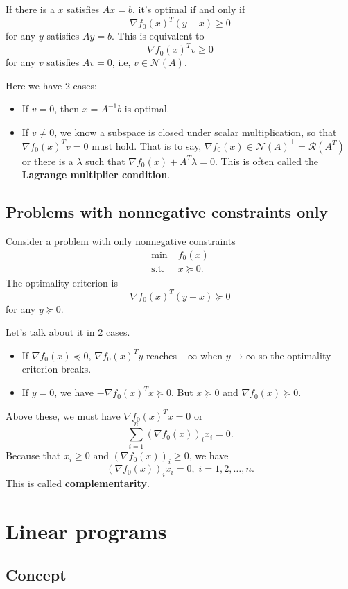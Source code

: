 \documentclass[lang=en,color=blue,mode=fancy,titlestyle=hang]{elegantbook}
\begin{document}
If there is a $x$ satisfies $A x = b$, it's optimal if and only if
\[
\nabla f_0(x)^T (y - x) \geq 0
\]
for any $y$ satisfies $A y = b$. This is equivalent to
\[
\nabla f_0(x)^T v \geq 0
\]
for any $v$ satisfies $A v = 0$, i.e, $v \in \mathcal{N}(A)$.

Here we have 2 cases:
\begin{itemize}
  \item If $v = 0$, then $x = A^{-1} b$ is optimal.
  \item If $v \neq 0$, we know a subspace is closed under scalar multiplication, so
  that $\nabla f_0(x)^T v = 0$ must hold. That is to say,
  $\nabla f_0(x) \in \mathcal{N}(A)^{\perp} = \mathcal{R}(A^T)$ or there is a $\lambda$
  such that $\nabla f_0(x) + A^T \lambda = 0$. This is often called the \textbf{Lagrange
  multiplier condition}.
\end{itemize}

\subsection{Problems with nonnegative constraints only}
Consider a problem with only nonnegative constraints
\begin{align*}
  \min \; &f_0(x) \\
  \text{s.t.} \; &x \succeq 0.
\end{align*}
The optimality criterion is
\[
\nabla f_0(x)^T (y - x) \succeq 0
\]
for any $y \succeq 0$.

Let's talk about it in 2 cases.
\begin{itemize}
  \item If $\nabla f_0(x) \preceq 0$, $\nabla f_0(x)^T y$ reaches $-\infty$ when
  $y \rightarrow \infty$ so the optimality criterion breaks.
  \item If $y = 0$, we have $- \nabla f_0(x)^T x \succeq 0$. But $x \succeq 0$ and
  $\nabla f_0(x) \succeq 0$.
\end{itemize}

Above these, we must have $\nabla f_0(x)^T x = 0$ or
\[
\sum_{i=1}^n (\nabla f_0(x))_i x_i = 0.
\]
Because that $x_i \geq 0$ and $(\nabla f_0(x))_i \geq 0$, we have
\[
(\nabla f_0(x))_i x_i = 0, \; i = 1, 2, \ldots, n.
\]
This is called \textbf{complementarity}.

\section{Linear programs}
\subsection{Concept}
\end{document}
